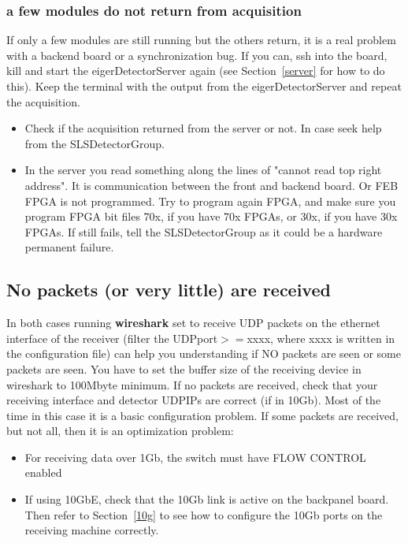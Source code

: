 \documentclass{article}
\begin{document}
\subsubsection{a few modules do not return from acquisition}
If only a few modules are still running but the others return, it is a real problem with a backend board or a synchronization bug.
If you can, ssh into the board, kill and start the eigerDetectorServer again (see Section~\ref{server} for how to do this). Keep the terminal with the output from the  eigerDetectorServer and repeat the acquisition. 
\begin{itemize}
\item Check if the acquisition returned from the server or not. In case seek help from the SLSDetectorGroup.
\item In the server you read something along the lines of "cannot read top right address". It is communication between the front and backend board. Or FEB FPGA is not programmed. Try to program again FPGA, and make sure you program FPGA bit files 70x, if you have 70x FPGAs, or 30x, if you have 30x FPGAs. If still fails, tell the SLSDetectorGroup as it could be a hardware permanent failure.
\end{itemize}

\subsection{No packets (or very little) are received} 
In both cases running \textbf{wireshark} set to receive UDP packets on the ethernet interface of the receiver (filter the UDPport$>=$xxxx, where xxxx is written in the configuration file) can help you understanding if NO packets are seen or some packets are seen. You have to set the buffer size of the receiving device in wireshark to 100Mbyte minimum. If no packets are received, check that your receiving interface and detector UDPIPs are correct (if in 10Gb). Most of the time in this case it is a basic configuration problem.
If some packets are received, but not all, then it is an optimization problem:
 \begin{itemize}
\item For receiving data over 1Gb, the switch must have FLOW CONTROL enabled 
\item If using 10GbE, check that the 10Gb link is active on the backpanel board. Then refer to Section~\ref{10g} to see how to configure the 10Gb ports on the receiving machine correctly. 
\end{itemize}
\end{document}
